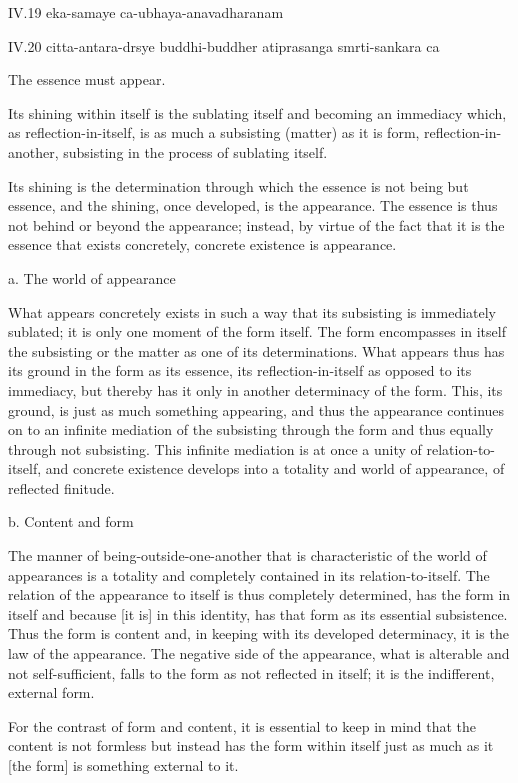 IV.19
eka-samaye ca-ubhaya-anavadharanam

IV.20
citta-antara-drsye buddhi-buddher atiprasanga smrti-sankara ca

The essence must appear.

Its shining within itself is
the sublating itself and
becoming an immediacy which,
as reflection-in-itself, is
as much a subsisting (matter)
as it is form, reflection-in-another,
subsisting in the process of sublating itself.

Its shining is the determination through which
the essence is not being but essence,
and the shining, once developed, is the appearance.
The essence is thus not behind or beyond the appearance;
instead, by virtue of the fact that it is
the essence that exists concretely,
concrete existence is appearance.

a. The world of appearance

What appears concretely exists in such a way
that its subsisting is immediately sublated;
it is only one moment of the form itself.
The form encompasses in itself the subsisting
or the matter as one of its determinations.
What appears thus has its ground in the form
as its essence, its reflection-in-itself
as opposed to its immediacy, but thereby has it
only in another determinacy of the form.
This, its ground, is just as much something appearing,
and thus the appearance continues on to an infinite mediation
of the subsisting through the form
and thus equally through not subsisting.
This infinite mediation is at once
a unity of relation-to-itself,
and concrete existence develops into a totality
and world of appearance, of reflected finitude.

b. Content and form

The manner of being-outside-one-another that is
characteristic of the world of appearances is
a totality and completely contained in its relation-to-itself.
The relation of the appearance to itself is
thus completely determined, has the form in itself
and because [it is] in this identity,
has that form as its essential subsistence.
Thus the form is content and,
in keeping with its developed determinacy,
it is the law of the appearance.
The negative side of the appearance,
what is alterable and not self-sufficient,
falls to the form as not reflected in itself;
it is the indifferent, external form.

    For the contrast of form and content,
    it is essential to keep in mind that
    the content is not formless but
    instead has the form within itself
    just as much as it [the form] is
    something external to it.

